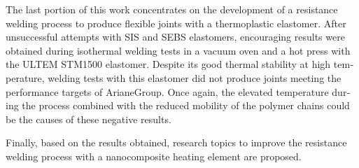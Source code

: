 \begin{otherlanguage}{english}
	The last portion of this work concentrates on the development of a resistance welding process to produce flexible joints with a thermoplastic elastomer. 
	After unsuccessful attempts with SIS and SEBS elastomers, encouraging results were obtained during isothermal welding tests in a vacuum oven and a hot press with the ULTEM STM1500 elastomer. 
	Despite its good thermal stability at high temperature, welding tests with this elastomer did not produce joints meeting the performance targets of ArianeGroup. 
	Once again, the elevated temperature during the process combined with the reduced mobility of the polymer chains could be the causes of these negative results. 
	
	Finally, based on the results obtained, research topics to improve the resistance welding process with a nanocomposite heating element are proposed. 
	
\end{otherlanguage}
